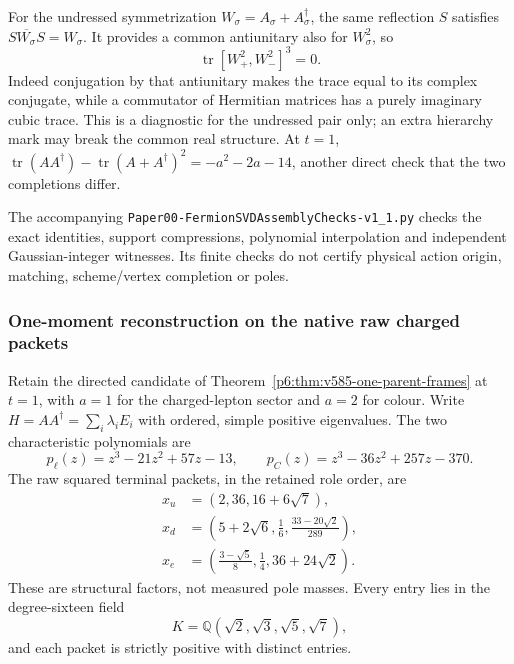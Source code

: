 \documentclass[11pt,a4paper]{article}
\begin{document}
For the undressed symmetrization $W_\sigma=A_\sigma+A_\sigma^\dagger$,
the same reflection $S$ satisfies $S\overline{W_\sigma}S=W_\sigma$.
It provides a common antiunitary also for $W_\sigma^2$, so
\[
 \operatorname{tr}[W_+^2,W_-^2]^3=0.
\]
Indeed conjugation by that antiunitary makes the trace equal to its complex
conjugate, while a commutator of Hermitian matrices has a purely imaginary
cubic trace. This is a diagnostic for the undressed pair only; an extra
hierarchy mark may break the common real structure. At $t=1$,
$\operatorname{tr}(AA^\dagger)-\operatorname{tr}(A+A^\dagger)^2
=-a^2-2a-14$, another direct check that the two completions differ.

The accompanying \texttt{Paper00-FermionSVDAssemblyChecks-v1\_1.py}
checks the exact identities, support compressions, polynomial interpolation
and independent Gaussian-integer witnesses. Its finite checks do not
certify physical action origin, matching, scheme/vertex completion or poles.


\subsubsection{One-moment reconstruction on the native raw charged packets}
\label{p6:app:v2109-one-moment-assembly}
Retain the directed candidate of Theorem~\ref{p6:thm:v585-one-parent-frames}
at \(t=1\), with \(a=1\) for the charged-lepton sector and \(a=2\) for
colour.  Write \(H=A A^\dagger=\sum_i\lambda_iE_i\) with ordered, simple
positive eigenvalues.  The two characteristic polynomials are
\[
 p_\ell(z)=z^3-21z^2+57z-13,\qquad
 p_C(z)=z^3-36z^2+257z-370.
\]
The raw squared terminal packets, in the retained role order, are
\[
\begin{aligned}
 x_u&=(2,36,16+6\sqrt7),\\
 x_d&=\left(5+2\sqrt6,\frac16,\frac{33-20\sqrt2}{289}\right),\\
 x_e&=\left(\frac{3-\sqrt5}{8},\frac14,36+24\sqrt2\right).
\end{aligned}
\]
These are structural factors, not measured pole masses.  Every entry lies
in the degree-sixteen field
\[
K=\mathbb Q(\sqrt2,\sqrt3,\sqrt5,\sqrt7),
\]
and each packet is strictly positive with distinct entries.
\end{document}
